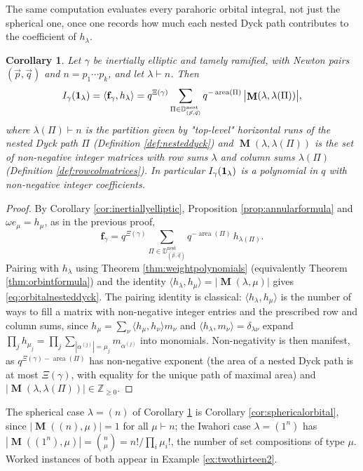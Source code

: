 \documentclass{amsart}
\numberwithin{equation}{section}
\newtheorem{corollary}[lemma]{Corollary}%
\theoremstyle{definition}
\def\16{{\bf 16}}
\def\1{{\bf 1}}
\DeclareMathOperator{\MM}{\mathbf{M}}
\newcommand{\fgamma}{\mathbf{f}_{\gamma}}
\newcommand{\Z}{{\mathbb Z}}
\newcommand{\nDyck}{\mathbb{D}^{\mathrm{nest}}}
\DeclareMathOperator{\area}{\mathrm{area}}
\begin{document}
The same computation evaluates every parahoric orbital integral, not just the spherical one, once one records how much each nested Dyck path contributes to the coefficient of $h_\lambda$.
\begin{corollary}
\label{cor:orbitalnesteddyck}
Let $\gamma$ be inertially elliptic and tamely ramified, with Newton pairs $(\vec p,\vec q)$ and $n=p_1\cdots p_k$, and let $\lambda\vdash n$. Then
\begin{equation}
\label{eq:orbitalnesteddyck}
I_\gamma(\1_\lambda)=\langle\fgamma,h_\lambda\rangle=q^{\Xi(\gamma)}\sum_{\Pi\in\nDyck_{(\vec p,\vec q)}}q^{-\area(\Pi)}\,\bigl|\MM(\lambda,\lambda(\Pi))\bigr|,
\end{equation}
where $\lambda(\Pi)\vdash n$ is the partition given by "top-level" horizontal runs of the nested Dyck path $\Pi$ (Definition \ref{def:nesteddyck}) and $\MM(\lambda,\lambda(\Pi))$ is the set of non-negative integer matrices with row sums $\lambda$ and column sums $\lambda(\Pi)$ (Definition \ref{def:rowcolmatrices}). In particular $I_\gamma(\1_\lambda)$ is a polynomial in $q$ with non-negative integer coefficients.
\end{corollary}
\begin{proof}
By Corollary \ref{cor:inertiallyelliptic}, Proposition \ref{prop:annularformula} and $\omega e_\mu=h_\mu$, as in the previous proof,
$$\fgamma=q^{\Xi(\gamma)}\sum_{\Pi\in\nDyck_{(\vec p,\vec q)}}q^{-\area(\Pi)}\,h_{\lambda(\Pi)}.$$
Pairing with $h_\lambda$ using Theorem \ref{thm:weightpolynomials} (equivalently Theorem \ref{thm:orbintformula}) and the identity $\langle h_\lambda,h_\mu\rangle=|\MM(\lambda,\mu)|$ gives \eqref{eq:orbitalnesteddyck}. The pairing identity is classical: $\langle h_\lambda,h_\mu\rangle$ is the number of ways to fill a matrix with non-negative integer entries and the prescribed row and column sums, since $h_\mu=\sum_\nu\langle h_\mu,h_\nu\rangle m_\nu$ and $\langle h_\lambda,m_\nu\rangle=\delta_{\lambda\nu}$ expand $\prod_j h_{\mu_j}=\prod_j\sum_{|\alpha^{(j)}|=\mu_j}m_{\alpha^{(j)}}$ into monomials. Non-negativity is then manifest, as $q^{\Xi(\gamma)-\area(\Pi)}$ has non-negative exponent (the area of a nested Dyck path is at most $\Xi(\gamma)$, with equality for the unique path of maximal area) and $|\MM(\lambda,\lambda(\Pi))|\in\Z_{\ge0}$.
\end{proof}

The spherical case $\lambda=(n)$ of Corollary \ref{cor:orbitalnesteddyck} is Corollary \ref{cor:sphericalorbital}, since $|\MM((n),\mu)|=1$ for all $\mu\vdash n$; the Iwahori case $\lambda=(1^n)$ has $|\MM((1^n),\mu)|=\binom{n}{\mu}=n!/\prod_i\mu_i!$, the number of set compositions of type $\mu$. Worked instances of both appear in Example \ref{ex:twothirteen2}.
\end{document}
